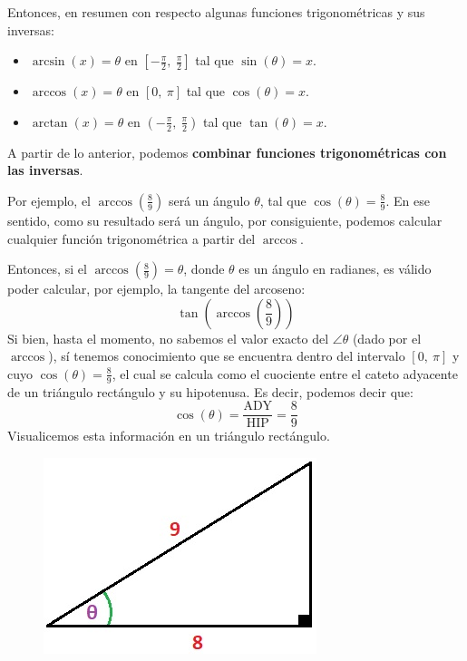 \documentclass[12pt]{article}
\begin{document}
Entonces, en resumen con respecto algunas funciones trigonométricas y sus inversas:

\begin{itemize}
\item $\arcsin(x) = \theta$ en $\left[-\frac{\pi}{2}, \ \frac{\pi}{2}\right]$ tal que $\sin(\theta) = x$.
\item $\arccos(x) = \theta$ en $[0, \ \pi]$ tal que $\cos(\theta) = x$.
\item $\arctan(x) = \theta$ en $\left(-\frac{\pi}{2}, \ \frac{\pi}{2}\right)$ tal que $\tan(\theta) = x$.
\end{itemize}

A partir de lo anterior, podemos \textbf{combinar funciones trigonométricas con las inversas}.

Por ejemplo, el $\arccos\left(\frac{8}{9}\right)$ será un ángulo $\theta$, tal que $\cos(\theta) = \frac{8}{9}$. En ese sentido, como su resultado será un ángulo, por consiguiente, podemos calcular cualquier función trigonométrica a partir del $\arccos$.

Entonces, si el $\arccos\left(\frac{8}{9}\right) = \theta$, donde $\theta$ es un ángulo en radianes, es válido poder calcular, por ejemplo, la tangente del arcoseno:
\[\tan\left(\arccos\left(\frac{8}{9}\right)\right)\]
Si bien, hasta el momento, no sabemos el valor exacto del $\angle \theta$ (dado por el $\arccos$), sí tenemos conocimiento que se encuentra dentro del intervalo $[0, \ \pi]$ y cuyo $\cos(\theta) = \frac{8}{9}$, el cual se calcula como el cuociente entre el cateto adyacente de un triángulo rectángulo y su hipotenusa. Es decir, podemos decir que:
\[\cos(\theta) = \frac{\text{ADY}}{\text{HIP}} = \frac{8}{9}\]
Visualicemos esta información en un triángulo rectángulo.

\begin{figure}[hbt!]
\centering
\includegraphics[scale=0.7]{img/rect-trig-inv-fun.jpg}
\end{figure}
\end{document}
